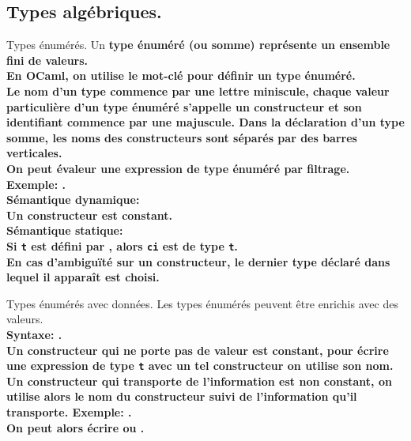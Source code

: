 \documentclass[french, 11pt]{article}
\begin{document}
\subsection{Types algébriques.}

\begin{defi}{Types énumérés.}{}
    Un \bf{type énuméré} (ou somme) représente un ensemble fini de valeurs.\\
    En OCaml, on utilise le mot-clé  pour définir un type énuméré.\\
    Le nom d'un type commence par une lettre miniscule, chaque valeur particulière d'un type énuméré s'appelle un constructeur et son identifiant commence par une majuscule. Dans la déclaration d'un type somme, les noms des constructeurs sont séparés par des barres verticales.\\
    On peut évaleur une expression de type énuméré par filtrage.\\
    \bf{Exemple:} .\\
    \bf{Sémantique dynamique:}\\
    Un constructeur est constant.\\
    \bf{Sémantique statique:}\\
    Si \texttt{t} est défini par , alors \texttt{ci} est de type \texttt{t}.\\
    En cas d'ambiguïté sur un constructeur, le dernier type déclaré dans lequel il apparaît est choisi. 
\end{defi}

\begin{defi}{Types énumérés avec données.}{}
    Les types énumérés peuvent être enrichis avec des valeurs.\\
    \bf{Syntaxe:} .\\
    Un constructeur qui ne porte pas de valeur est constant, pour écrire une expression de type \texttt{t} avec un tel constructeur on utilise son nom.\\
    Un constructeur qui transporte de l'information est non constant, on utilise alors le nom du constructeur suivi de l'information qu'il transporte.\n
    \bf{Exemple:} .\\
    On peut alors écrire  ou .
\end{defi}
\end{document}
